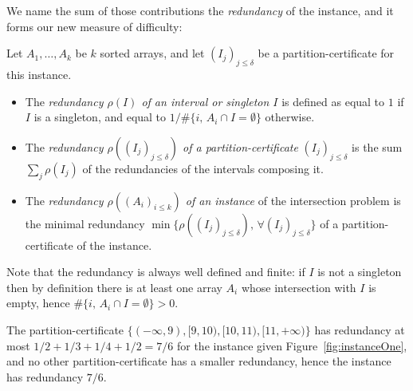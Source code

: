 %
We name the sum of those contributions the {\em redundancy} of the
instance, and it forms our new measure of difficulty:
%
\begin{definition} \label{def:redundancy}
Let $A_1,\ldots,A_k$ be $k$ sorted arrays, 
and let $(I_j)_{j\leq\delta}$ be a partition-certificate for this instance.
\begin{itemize}
\item The {\em redundancy $\rho(I)$ of an interval or singleton $I$} is defined as 
equal to $1$ if $I$ is a singleton, and equal to $1/\#\{i,\,A_i\cap I=\emptyset\}$ otherwise.
\item The {\em redundancy $\rho((I_j)_{j\leq\delta})$ of a
partition-certificate} $(I_j)_{j\leq\delta}$ is the sum $\sum_j
\rho(I_j)$ of the redundancies of the intervals composing it.
\item The {\em redundancy $\rho\left( (A_i)_{i\leq k}\right)$ of an
instance} of the intersection problem is the minimal redundancy $\min
\{ \rho\left((I_j)_{j\leq\delta}\right),\, \forall (I_j)_{j\leq\delta}
\}$ of a partition-certificate of the instance.
\end{itemize}
\end{definition}

Note that the redundancy is always well defined and finite: if $I$ is
not a singleton then by definition there is at least one array $A_i$
whose intersection with $I$ is empty, hence
$\#\{i,\,A_i\cap I=\emptyset\}>0$.
%
\begin{example}
The partition-certificate
$\{(-\infty,9),[9,10),[10,11),[11,+\infty)\}$ has redundancy at most
${1/2}{+}{1/3}{+}{1/4}{+}{1/2} = {7/6}$ for the
instance given Figure~\ref{fig:instanceOne}, and no other
partition-certificate has a smaller redundancy, hence the instance has
redundancy ${7/6}$.
\end{example}

